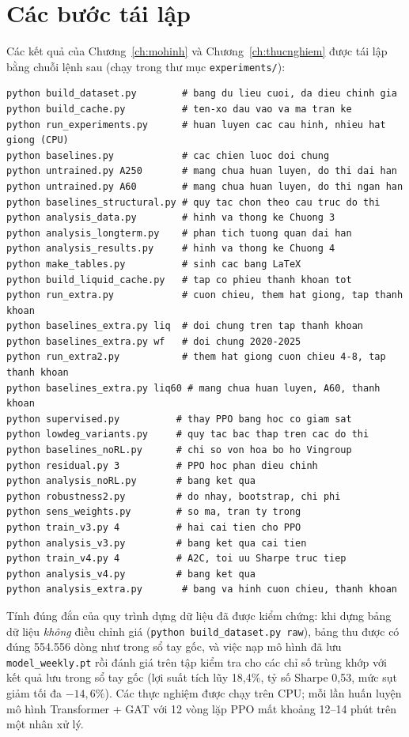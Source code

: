 \section{Các bước tái lập}

Các kết quả của Chương~\ref{ch:mohinh} và Chương~\ref{ch:thucnghiem} được tái lập bằng chuỗi lệnh sau (chạy trong thư mục \texttt{experiments/}):

{\small\begin{verbatim}
python build_dataset.py        # bang du lieu cuoi, da dieu chinh gia
python build_cache.py          # ten-xo dau vao va ma tran ke
python run_experiments.py      # huan luyen cac cau hinh, nhieu hat giong (CPU)
python baselines.py            # cac chien luoc doi chung
python untrained.py A250       # mang chua huan luyen, do thi dai han
python untrained.py A60        # mang chua huan luyen, do thi ngan han
python baselines_structural.py # quy tac chon theo cau truc do thi
python analysis_data.py        # hinh va thong ke Chuong 3
python analysis_longterm.py    # phan tich tuong quan dai han
python analysis_results.py     # hinh va thong ke Chuong 4
python make_tables.py          # sinh cac bang LaTeX
python build_liquid_cache.py   # tap co phieu thanh khoan tot
python run_extra.py            # cuon chieu, them hat giong, tap thanh khoan
python baselines_extra.py liq  # doi chung tren tap thanh khoan
python baselines_extra.py wf   # doi chung 2020-2025
python run_extra2.py           # them hat giong cuon chieu 4-8, tap thanh khoan
python baselines_extra.py liq60 # mang chua huan luyen, A60, thanh khoan
python supervised.py          # thay PPO bang hoc co giam sat
python lowdeg_variants.py     # quy tac bac thap tren cac do thi
python baselines_noRL.py      # chi so von hoa bo ho Vingroup
python residual.py 3          # PPO hoc phan dieu chinh
python analysis_noRL.py       # bang ket qua
python robustness2.py         # do nhay, bootstrap, chi phi
python sens_weights.py        # so ma, tran ty trong
python train_v3.py 4          # hai cai tien cho PPO
python analysis_v3.py         # bang ket qua cai tien
python train_v4.py 4          # A2C, toi uu Sharpe truc tiep
python analysis_v4.py         # bang ket qua
python analysis_extra.py       # bang va hinh cuon chieu, thanh khoan
\end{verbatim}}

Tính đúng đắn của quy trình dựng dữ liệu đã được kiểm chứng: khi dựng bảng dữ liệu \emph{không} điều chỉnh giá (\texttt{python build\_dataset.py raw}), bảng thu được có đúng 554.556 dòng như trong sổ tay gốc, và việc nạp mô hình đã lưu \texttt{model\_weekly.pt} rồi đánh giá trên tập kiểm tra cho các chỉ số trùng khớp với kết quả lưu trong sổ tay gốc (lợi suất tích lũy 18,4\%, tỷ số Sharpe 0,53, mức sụt giảm tối đa $-14{,}6\%$). Các thực nghiệm được chạy trên CPU; mỗi lần huấn luyện mô hình Transformer + GAT với 12 vòng lặp PPO mất khoảng 12--14 phút trên một nhân xử lý.

